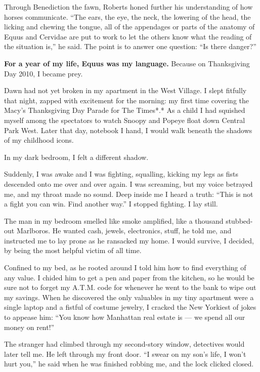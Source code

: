 Through Benediction the fawn, Roberts honed further his understanding of
how horses communicate. ``The ears, the eye, the neck, the lowering of
the head, the licking and chewing the tongue, all of the appendages or
parts of the anatomy of Equus and Cervidae are put to work to let the
others know what the reading of the situation is,'' he said. The point
is to answer one question: ``Is there danger?''

\textbf{For a year of my life, Equus was my language.} Because on
Thanksgiving Day 2010, I became prey.

Dawn had not yet broken in my apartment in the West Village. I slept
fitfully that night, zapped with excitement for the morning: my first
time covering the Macy's Thanksgiving Day Parade for The Times*.* As a
child I had squished myself among the spectators to watch Snoopy and
Popeye float down Central Park West. Later that day, notebook I hand, I
would walk beneath the shadows of my childhood icons.

In my dark bedroom, I felt a different shadow.

Suddenly, I was awake and I was fighting, squalling, kicking my legs as
fists descended onto me over and over again. I was screaming, but my
voice betrayed me, and my throat made no sound. Deep inside me I heard a
truth: ``This is not a fight you can win. Find another way.'' I stopped
fighting. I lay still.

The man in my bedroom smelled like smoke amplified, like a thousand
stubbed-out Marlboros. He wanted cash, jewels, electronics, stuff, he
told me, and instructed me to lay prone as he ransacked my home. I would
survive, I decided, by being the most helpful victim of all time.

Confined to my bed, as he rooted around I told him how to find
everything of any value. I chided him to get a pen and paper from the
kitchen, so he would be sure not to forget my A.T.M. code for whenever
he went to the bank to wipe out my savings. When he discovered the only
valuables in my tiny apartment were a single laptop and a fistful of
costume jewelry, I cracked the New Yorkiest of jokes to appease him:
``You know how Manhattan real estate is --- we spend all our money on
rent!''

The stranger had climbed through my second-story window, detectives
would later tell me. He left through my front door. ``I swear on my
son's life, I won't hurt you,'' he said when he was finished robbing me,
and the lock clicked closed.

